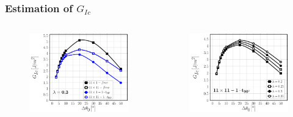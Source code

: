 \documentclass[first,firstsupp,lastsupp,last,hyperref,table]{ETHclass}
\begin{document}
\begin{frame}
\frametitle{\vspace{0.2cm}\small Estimation of $G_{Ic}$}
\vspace{-.75cm}
\centering
\begin{columns}[c]
\centering
\begin{column}{0.5\textwidth}
\centering
\begin{figure}
\centering
\includegraphics[width=\columnwidth]{vf60-GIc-model.pdf}
\end{figure}
\end{column}
\begin{column}{0.5\textwidth}
\centering
\begin{figure}
\centering
\includegraphics[width=\columnwidth]{vf60-GIc-lambda.pdf}

\end{figure}
\end{column}
\end{columns}
\end{frame}
\end{document}
